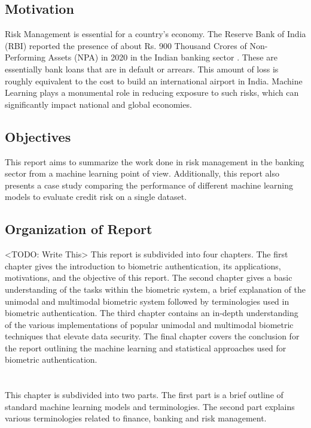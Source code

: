 \documentclass[a4paper, 12pt]{article}
\begin{document}
\vskip 0.2in
\subsection{Motivation}
Risk Management is essential for a country's economy. The Reserve Bank of India (RBI) reported the presence of about Rs. 900 Thousand Crores of Non-Performing Assets (NPA) in 2020 in the Indian banking sector \cite{rbi20}. These are essentially bank loans that are in default or arrears. This amount of loss is roughly equivalent to the cost to build an international airport in India. Machine Learning plays a monumental role in reducing exposure to such risks, which can significantly impact national and global economies.
\vskip 0.2in
\subsection{Objectives}
This report aims to summarize the work done in risk management in the banking sector from a machine learning point of view. Additionally, this report also presents a case study comparing the performance of different machine learning models to evaluate credit risk on a single dataset.
\vskip 0.2in
\subsection{Organization of Report}
<TODO: Write This>
This report is subdivided into four chapters. The first chapter gives the introduction to biometric authentication, its applications, motivations, and the objective of this report. The second chapter gives a basic understanding of the tasks within the biometric system, a brief explanation of the unimodal and multimodal biometric system followed by terminologies used in biometric authentication. The third chapter contains an in-depth understanding of the various implementations of popular unimodal and multimodal biometric techniques that elevate data security. The final chapter covers the conclusion for the report outlining the machine learning and statistical approaches used for biometric authentication.
\newpage

\section{}
\vskip 0.25in
This chapter is subdivided into two parts. The first part is a brief outline of standard machine learning models and terminologies. The second part explains various terminologies related to finance, banking and risk management.
\vskip 0.2in
\end{document}
